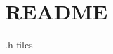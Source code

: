\chapter{README}
\hypertarget{md_game_2include_2_r_e_a_d_m_e}{}\label{md_game_2include_2_r_e_a_d_m_e}
.h files 